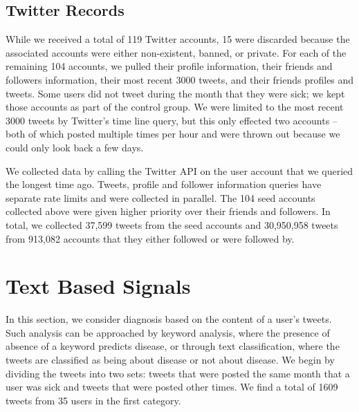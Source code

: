 \documentclass{acm_proc_article-sp}
\begin{document}
\subsection{Twitter Records}
While we received a total of 119 Twitter accounts, 15 were discarded because the associated accounts were either non-existent, banned, or private. For each of the remaining 104 accounts, we pulled their profile information, their friends and followers information, their most recent 3000 tweets, and their friends profiles and tweets. Some users did not tweet during the month that they were sick; we kept those accounts as part of the control group. We were limited to the most recent 3000 tweets by Twitter's time line query, but this only effected two accounts -- both of which posted multiple times per hour and were thrown out because we could only look back a few days.

We collected data by calling the Twitter API on the user account that we queried the longest time ago. Tweets, profile and follower information queries have separate rate limits and were collected in parallel. The 104 seed accounts collected above were given higher priority over their friends and followers. In total, we collected 37,599 tweets from the seed accounts and 30,950,958 tweets from 913,082 accounts that they either followed or were followed by.


\section{Text Based Signals}
\label{sec:text_analysis}

In this section, we consider diagnosis based on the content of a user's tweets. Such analysis can be approached by keyword analysis, where the presence of absence of a keyword predicts disease, or through text classification, where the tweets are classified as being about disease or not about disease. We begin by dividing the tweets into two sets: tweets that were posted the same month that a user was sick and tweets that were posted other times. We find a total of 1609 tweets from 35 users in the first category.
\end{document}
